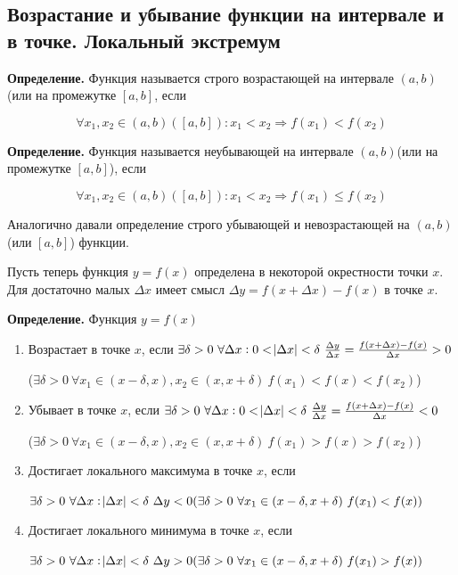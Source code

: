 \documentclass{article}
\begin{document}
\subsection{Возрастание и убывание функции на интервале и в точке. Локальный экстремум}

\textbf{Определение.} Функция называется строго возрастающей на интервале \((a, b)\)(или на промежутке \([a, b]\), если

\[\forall x_1, x_2 \in (a,b)([a,b]): x_1 < x_2 \Rightarrow f(x_1) < f(x_2)\]

\textbf{Определение.} Функция называется неубывающей на интервале \((a, b)\)(или на промежутке \([a, b]\)), если

\[\forall x_1, x_2 \in (a, b)([a, b]): x_1 < x_2 \Rightarrow f(x_1) \leq f(x_2)\]

Аналогично давали определение строго убывающей и невозрастающей на \((a, b)\)(или \([a,b]\)) функции.

Пусть теперь функция \(y = f(x)\) определена в некоторой окрестности точки \(x\). Для достаточно малых \(\Delta x\) имеет смысл \(\Delta y = f(x+\Delta x) - f(x)\) в точке \(x\).

\textbf{Определение.} Функция \(y = f(x)\)

\begin{enumerate}
    \item Возрастает в точке \(x\), если \(\exists \delta > 0\ \forall \Delta x: 0 < \abs{\Delta x} < \delta\ \frac{\Delta y}{\Delta x} = \frac{f(x+\Delta x)-f(x)}{\Delta x} > 0\)
    
    (\(\exists \delta > 0\ \forall x_1 \in (x-\delta, x), x_2 \in (x, x + \delta)\ f(x_1) < f(x) < f(x_2)\))
    \item Убывает в точке \(x\), если \(\exists \delta > 0\ \forall \Delta x: 0 < \abs{\Delta x} < \delta\ \frac{\Delta y}{\Delta x} = \frac{f(x+\Delta x)-f(x)}{\Delta x} < 0\)
    
    (\(\exists \delta > 0\ \forall x_1 \in (x-\delta, x), x_2 \in (x, x + \delta)\ f(x_1) > f(x) > f(x_2)\))
    \item Достигает локального максимума в точке \(x\), если
    
    \(\exists \delta > 0\ \forall \Delta x: \abs{\Delta x} < \delta\ \Delta y < 0(\exists \delta > 0\ \forall x_1 \in (x - \delta, x + \delta)\ f(x_1) < f(x))\)
    \item Достигает локального минимума в точке \(x\), если
    
    \(\exists \delta > 0\ \forall \Delta x: \abs{\Delta x} < \delta\ \Delta y > 0(\exists \delta > 0\ \forall x_1 \in (x - \delta, x + \delta)\ f(x_1) > f(x))\)
\end{enumerate}
\end{document}
